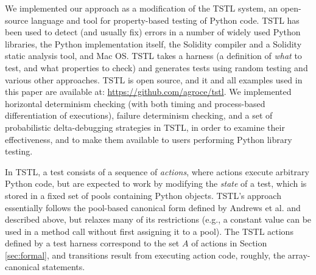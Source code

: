We implemented our approach as a modification of the TSTL \cite{tstlsttt}
system, an open-source
language and tool for property-based testing
\cite{Hypothesis,ClaessenH00} of Python code.  TSTL has
been used to detect (and usually fix) errors in a number of widely
used Python libraries, the Python implementation itself, the Solidity
compiler and a Solidity static analysis tool, and Mac OS.
 TSTL takes a harness (a
definition of \emph{what} to test, and what properties to check) and
generates tests using random testing and various other approaches.
TSTL is open source, and it and all examples used in this paper are
available at:  \url{https://github.com/agroce/tstl}.  We implemented
horizontal determinism checking (with both timing and process-based
differentiation of executions), failure determinism checking, and a
set of probabilistic delta-debugging strategies in TSTL, in order to
examine their effectiveness, and to make them available to users
performing Python library testing.
\begin{comment}
TSTL can also be installed using Python's {\tt pip} tool, by typing
{\tt pip install tstl}; you will need to clone the github repository
to have access to the case studies used in the paper, however.

TSTL has
been used to detect (and usually fix) errors in a number of widely
used Python libraries, the Python implementation itself, the Solidity
compiler and a Solidity static analysis tool, and Mac OS \cite{tstl}.

\begin{figure}
  {\scriptsize
\begin{code}
pool: <int> 5
pool: <l> 5
pool: <s> 5
\vspace{0.1in}
<int> := <[1..20]>
<l> := []
<l> := list(<s>)
<s> := set()
<s> := set(<l>)
\vspace{0.1in}
<l>.append(<int>)
\{ValueError\} <l>.remove(<int>)
<s>.add(<int>)
\{KeyError\} <s>.remove(<int>)
\vspace{0.1in}
property: len(<l>) >= len(set(<l,1>))
property: len(<s>) == len(list(<s,1>))
\end{code}
}
\caption{Simple TSTL harness testing lists and sets}
\label{fig:simple}
\end{figure}
\end{comment}

In TSTL, a test consists of a sequence of
\emph{actions}, where actions execute arbitrary Python code, but are
expected to work by modifying the \emph{state} of a test, which is
stored in a fixed set of pools containing Python objects.  TSTL's
approach essentially follows the pool-based canonical form defined by
Andrews et al. \cite{AndrewsTR} and described above, but relaxes many of its restrictions
(e.g., a constant value can be used in a method call without first
assigning it to a pool). The
TSTL actions defined by a test harness correspond to the set $A$ of
actions in Section \ref{sec:formal}, and transitions 
result from executing action code, roughly, the array-canonical
statements.

